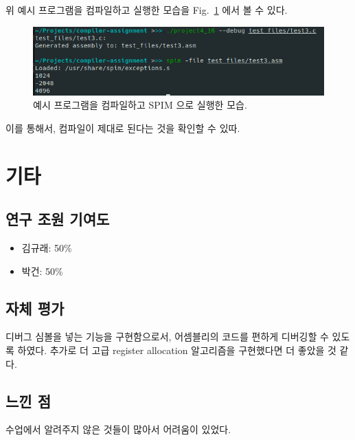 \documentclass[a4paper,12p]{paper}
\begin{document}
위 예시 프로그램을 컴파일하고 실행한 모습을 Fig.~\ref{fig:screen} 에서 볼 수 있다.

\begin{figure}[ht]
  \centering
\includegraphics[scale=0.7]{figs/screenshot.png}
\caption{예시 프로그램을 컴파일하고 SPIM 으로 실행한 모습.}\label{fig:screen}
\end{figure}

이를 통해서, 컴파일이 제대로 된다는 것을 확인할 수 있따.

\section{기타}
\subsection{연구 조원 기여도}
\begin{itemize}
	\item 김규래: 50\%
	\item 박건: 50\%
\end{itemize}

\subsection{자체 평가}
디버그 심볼을 넣는 기능을 구현함으로서, 어셈블리의 코드를 편하게 디버깅할 수 있도록 하였다. 추가로 더 고급 register allocation 알고리즘을 구현했다면 더 좋았을 것 같다.

\subsection{느낀 점}
수업에서 알려주지 않은 것들이 많아서 어려움이 있었다.
\end{document}
